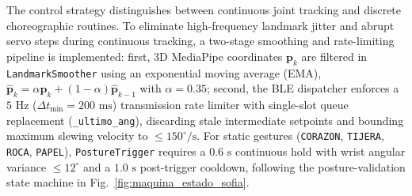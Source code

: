 \documentclass[lettersize,journal]{IEEEtran}
\begin{document}
	The control strategy distinguishes between continuous joint tracking and discrete choreographic routines. To eliminate high-frequency landmark jitter and abrupt servo steps during continuous tracking, a two-stage smoothing and rate-limiting pipeline is implemented: first, 3D MediaPipe coordinates $\mathbf{p}_k$ are filtered in \texttt{LandmarkSmoother} using an exponential moving average (EMA), $\hat{\mathbf{p}}_k = \alpha \mathbf{p}_k + (1 - \alpha)\hat{\mathbf{p}}_{k-1}$ with $\alpha = 0.35$; second, the BLE dispatcher enforces a $5\text{ Hz}$ ($\Delta t_{\min} = 200\text{ ms}$) transmission rate limiter with single-slot queue replacement (\texttt{\_ultimo\_ang}), discarding stale intermediate setpoints and bounding maximum slewing velocity to $\le 150^\circ/\text{s}$. For static gestures (\texttt{CORAZON}, \texttt{TIJERA}, \texttt{ROCA}, \texttt{PAPEL}), \texttt{PostureTrigger} requires a $0.6\text{ s}$ continuous hold with wrist angular variance $\le 12^\circ$ and a $1.0\text{ s}$ post-trigger cooldown, following the posture-validation state machine in Fig.~\ref{fig:maquina_estado_sofia}.
	
\end{document}
